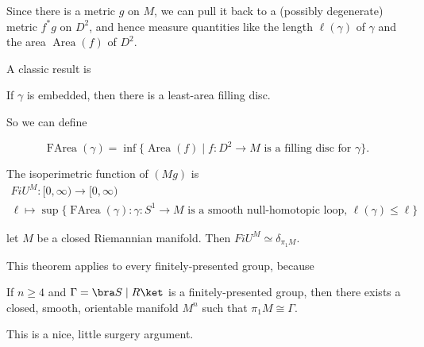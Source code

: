 \documentclass[a4paper]{article}
\DeclareMathOperator\Area{Area}
\DeclareMathOperator\FArea{FArea}
\begin{document}
Since there is a metric $g$ on $M$, we can pull it back to a (possibly degenerate) metric $f^* g$ on $D^2$, and hence measure quantities like the length $\ell(\gamma)$ of $\gamma$ and the area $\Area(f)$ of $D^2$.

A classic result is
\begin{thm} %
  If $\gamma$ is embedded, then there is a least-area filling disc.
\end{thm}
So we can define
\begin{defi}[$\FArea$]\index{$\FArea$}
  \[
    \FArea(\gamma) = \inf \{\Area(f) \mid f: D^2 \to M\text{ is a filling disc for }\gamma\}.
  \]
\end{defi}

\begin{defi}
  The isoperimetric function of $(M g)$ is
  \begin{multline*}
    FiU^M: [0, \infty) \to [0, \infty)\\
    \ell \mapsto \sup\{\FArea(\gamma): \gamma: S^1 \to M\text{ is a smooth null-homotopic loop, }\ell(\gamma) \leq \ell\}
  \end{multline*}
\end{defi}

\begin{thm} %
  let $M$ be a closed Riemannian manifold. Then $FiU^M \simeq \delta_{\pi_1 M}$.
\end{thm}

This theorem applies to every finitely-presented group, because
\begin{thm}
  If $n \geq 4$ and $\Gamma = \bra S \mid R\ket$ is a finitely-presented group, then there exists a closed, smooth, orientable manifold $M^n$ such that $\pi_1 M \cong \Gamma$.
\end{thm}
This is a nice, little surgery argument.
\end{document}
